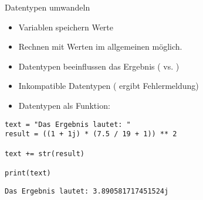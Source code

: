 
\begin{frame}[fragile]{Datentypen umwandeln}
%
\begin{itemize}
\item Variablen speichern Werte
\item Rechnen mit Werten im allgemeinen möglich.
\item Datentypen beeinflussen das Ergebnis ( vs. )
\item Inkompatible Datentypen ( ergibt Fehlermeldung)
\item Datentypen als Funktion:  \thus~ 
\end{itemize}
%
\begin{minipage}[t]{.52\linewidth}
\phantom{x}
\begin{codebox}
\begin{verbatim}
text = "Das Ergebnis lautet: "
result = ((1 + 1j) * (7.5 / 19 + 1)) ** 2

text += str(result)

print(text)
\end{verbatim}
\end{codebox}
\end{minipage}
%
\begin{minipage}[t]{.47\linewidth}
\phantom{x}
\begin{cmdbox}
\begin{verbatim}
Das Ergebnis lautet: 3.890581717451524j
\end{verbatim}
\end{cmdbox}
\end{minipage}
%
\end{frame}


